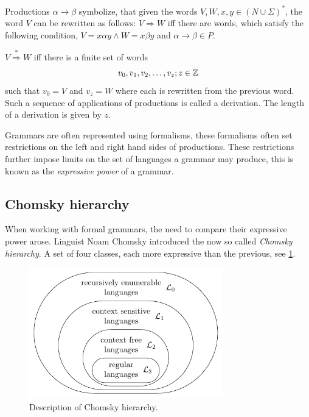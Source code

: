 Productions $\alpha \rightarrow \beta$ symbolize, that given the words $V,W,x,y \in \left( N \cup \Sigma \right)^{*}$, the word $V$ can be rewritten as follows:
$V \Rightarrow W$ iff there are words, which satisfy the following condition, $V=x\alpha y \wedge W=x\beta y$ and $\alpha \rightarrow \beta \in P$.

\begin{definition}[Derivation]
\label{def:derivation}
$V \stackrel{*}{\Rightarrow}  W$ iff there is a finite set of words 
$$ v_0, v_1, v_2, \dots, v_z;\medskip z \in \mathbb{Z}$$
such that $v_0 = V$ and $v_z = W$ where each is rewritten from the previous word. Such a sequence of applications of productions is called a derivation.
The length of a derivation is given by $z$. 
\end{definition}

Grammars are often represented using formalisms, these formalisms often set restrictions on the left and right hand sides of productions. These restrictions further impose limits on the set of languages a grammar may produce, this is known as the \emph{expressive power} of a grammar. 

\subsection{Chomsky hierarchy}
When working with formal grammars, the need to compare their expressive power arose. Linguist Noam Chomsky introduced the now so called \emph{Chomsky hierarchy}\cite{chomsky1956three}. A set of four classes, each more expressive than the previous, see \cref{fig:chomsky-hierarchy}.



\begin{figure}[h]
  \label{fig:chomsky-hierarchy}
  \centering
  \includegraphics[width=0.75\textwidth]{figures/chomsky-hierarchy.pdf}
  \caption{Description of Chomsky hierarchy.}
\end{figure}

